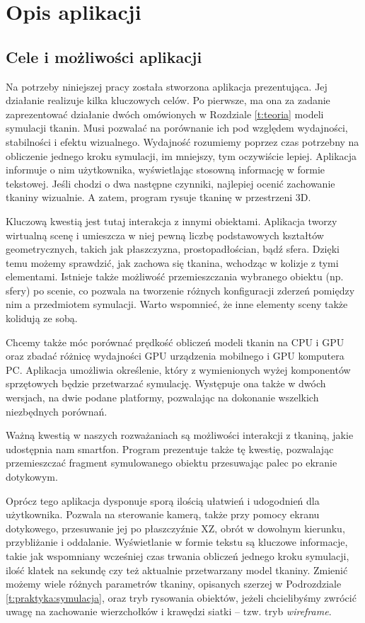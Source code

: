 \chapter{Opis aplikacji}
\label{t:praktyka}
	
	\section{Cele i możliwości aplikacji}
	\label{t:praktyka:cel}
	
	
	Na potrzeby niniejszej pracy została stworzona aplikacja prezentująca. Jej działanie realizuje kilka kluczowych celów. Po pierwsze, ma ona za zadanie zaprezentować działanie dwóch omówionych w Rozdziale \ref{t:teoria} modeli symulacji tkanin. Musi pozwalać na porównanie ich pod względem wydajności, stabilności i efektu wizualnego. Wydajność rozumiemy poprzez czas potrzebny na obliczenie jednego kroku symulacji, im mniejszy, tym oczywiście lepiej. Aplikacja informuje o nim użytkownika, wyświetlając stosowną informację w formie tekstowej. Jeśli chodzi o dwa następne czynniki, najlepiej ocenić zachowanie tkaniny wizualnie. A zatem, program rysuje tkaninę w przestrzeni 3D. 
	
	Kluczową kwestią jest tutaj interakcja z innymi obiektami. Aplikacja tworzy wirtualną scenę i umieszcza w niej pewną liczbę podstawowych kształtów geometrycznych, takich jak płaszczyzna, prostopadłościan, bądź sfera. Dzięki temu możemy sprawdzić, jak zachowa się tkanina, wchodząc w kolizje z tymi elementami. Istnieje także możliwość przemieszczania wybranego obiektu (np. sfery) po scenie, co pozwala na tworzenie różnych konfiguracji zderzeń pomiędzy nim a przedmiotem symulacji. Warto wspomnieć, że inne elementy sceny także kolidują ze sobą.
	
	Chcemy także móc porównać prędkość obliczeń modeli tkanin na CPU i GPU oraz zbadać różnicę wydajności GPU urządzenia mobilnego i GPU komputera PC. Aplikacja umożliwia określenie, który z wymienionych wyżej komponentów sprzętowych będzie przetwarzać symulację. Występuje ona także w dwóch wersjach, na dwie podane platformy, pozwalając na dokonanie wszelkich niezbędnych porównań.
	
	Ważną kwestią w naszych rozważaniach są możliwości interakcji z tkaniną, jakie udostępnia nam smartfon. Program prezentuje także tę kwestię, pozwalając przemieszczać fragment symulowanego obiektu przesuwając palec po ekranie dotykowym.
	
	Oprócz tego aplikacja dysponuje sporą ilością ułatwień i udogodnień dla użytkownika. Pozwala na sterowanie kamerą, także przy pomocy ekranu dotykowego, przesuwanie jej po płaszczyźnie XZ, obrót w dowolnym kierunku, przybliżanie i oddalanie. Wyświetlanie w formie tekstu są kluczowe informacje, takie jak wspomniany wcześniej czas trwania obliczeń jednego kroku symulacji, ilość klatek na sekundę czy też aktualnie przetwarzany model tkaniny. Zmienić możemy wiele różnych parametrów tkaniny, opisanych szerzej w Podrozdziale \ref{t:praktyka:symulacja}, oraz tryb rysowania obiektów, jeżeli chcielibyśmy zwrócić uwagę na zachowanie wierzchołków i krawędzi siatki -- tzw. tryb \emph{wireframe}.
	
